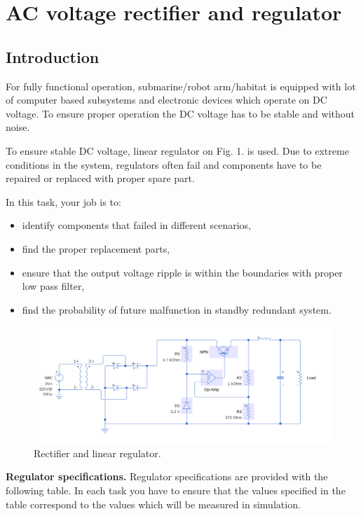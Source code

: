 \documentclass[a4paper]{article}
\begin{document}
\section{AC voltage rectifier and regulator}

\subsection{Introduction}

For fully functional operation, submarine/robot arm/habitat is equipped with 
lot of computer based subsystems and electronic devices which operate on DC 
voltage. To ensure proper operation the DC voltage has to be stable and without 
noise.

To ensure stable DC voltage, linear regulator on Fig. 1. is used. Due to 
extreme conditions in the system, regulators often fail and components have to 
be repaired or replaced with proper spare part.

In this task, your job is to:
\begin{itemize}
\item identify components that failed in different scenarios, 
\item find the proper replacement parts, 
\item ensure that the output voltage ripple is within the boundaries with 
proper low pass filter,
\item find the probability of future malfunction in standby redundant system.
\end{itemize}

\begin{figure}[h!]
\centering
\includegraphics[width=\linewidth]{images/reg.png}

\caption{Rectifier and linear regulator.}
\end{figure}

\textbf{Regulator specifications.} Regulator specifications are provided with 
the following table. In each task you have to ensure that the values specified
in the table correspond to the values which will be measured in simulation. 
\end{document}
